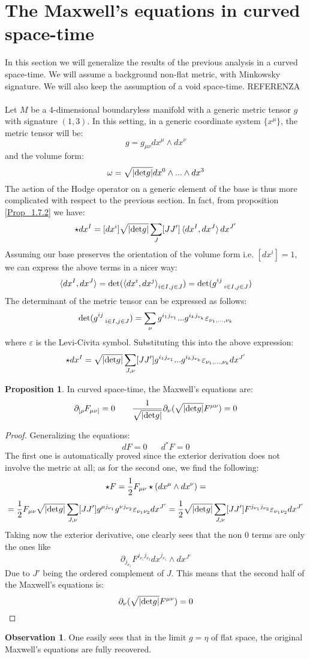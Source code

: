 \documentclass[12pt,a4paper]{report}
\theoremstyle{definition}
\theoremstyle{Theorem}
\newtheorem{Prop}[Def]{Proposition}
\theoremstyle{definition}
\theoremstyle{definition}
\newtheorem{Obs}[Def]{Observation}
\begin{document}
	\section{The Maxwell's equations in curved space-time}
	In this section we will generalize the results of the previous analysis in a curved space-time. We will assume a background non-flat metric, with Minkowsky signature. We will also keep the assumption of a void space-time. REFERENZA
	\\\\
	Let $M$ be a 4-dimensional boundaryless manifold with a generic metric tensor $g$ with signature $(1,3)$. In this setting, in a generic coordinate system $\{x^\mu\}$, the metric tensor will be:
	$$g=g_{\mu\nu}dx^\mu\wedge dx^\nu$$
	and the volume form:
	$$\omega=\sqrt{|\hbox{det}g|}dx^0\wedge...\wedge dx^3$$
	The action of the Hodge operator on a generic element of the base is thus more complicated with respect to the previous section. In fact, from proposition \ref{Prop_1.7.2} we have:
	$$\star dx^I=[dx^i]\sqrt{|\hbox{det}g|}\sum_J [JJ']\braket{dx^I,dx^J}dx^{J'}$$
	Assuming our base preserves the orientation of the volume form i.e. $[dx^i]=1$, we can express the above terms in a nicer way:
	$$\braket{dx^I,dx^J}=\hbox{det}(\braket{dx^i,dx^j}_{i\in I,j\in J})=\hbox{det}(g^{ij}_{\hspace{9pt}i\in I,j\in J})$$
	The determinant of the metric tensor can be expressed as follows:
	$$\hbox{det}(g^{ij}_{\hspace{9pt}i\in I,j\in J})=\sum_\nu g^{i_1j_{\nu_1}}...g^{i_kj_{\nu_k}}\varepsilon_{\nu_1,...,\nu_k}$$
	where $\varepsilon$ is the Levi-Civita symbol. Substituting this into the above expression:
	$$\star dx^I=\sqrt{|\hbox{det}g|}\sum_{J,\nu} [JJ']g^{i_1j_{\nu_1}}...g^{i_kj_{\nu_k}}\varepsilon_{\nu_1,...,\nu_k}dx^{J'}$$
	\begin{Prop}
		In curved space-time, the Maxwell's equations are:
		$$\partial_{[\rho} F_{\mu\nu]}=0\hspace{20 pt} {1\over \sqrt{|\hbox{det}g|}}\partial_\nu (\sqrt{|\hbox{det}g|}F^{\mu\nu})=0$$
	\end{Prop}
	\begin{proof}
		Generalizing the equations: 
		$$dF=0\hspace{20pt} d^*F=0$$
		The first one is automatically proved since the exterior derivation does not involve the metric at all; as for the second one, we find the following:
		$$\star F={1\over 2}F_{\mu\nu}\star( dx^\mu\wedge dx^\nu)=$$
		$$={1\over 2}F_{\mu\nu}\sqrt{|\hbox{det}g|}\sum_{J,\nu}[JJ']g^{\mu j_{\nu_1}}g^{\nu j_{\nu_2}}\varepsilon_{\nu_1\nu_2} dx^{J'}={1\over 2}\sqrt{|\hbox{det}g|}\sum_{J,\nu}[JJ']F^{j_{\nu_1}j_{\nu_2}}\varepsilon_{\nu_1\nu_2} dx^{J'}$$
		Taking now the exterior derivative, one clearly sees that the non 0 terms are only the ones like $$\partial_{j_{\nu_1}}F^{j_{\nu_1}j_{\nu_2}}dx^{j_{\nu_1}}\wedge dx^{J'}$$ 
		Due to $J'$ being the ordered complement of $J$. This means that the second half of the Maxwell's equations is:
		$$\partial_\nu (\sqrt{|\hbox{det}g|}F^{\mu\nu})=0$$
	\end{proof}
	\begin{Obs}
		One easily sees that in the limit $g=\eta$ of flat space, the original Maxwell's equations are fully recovered.
	\end{Obs}
\end{document}

